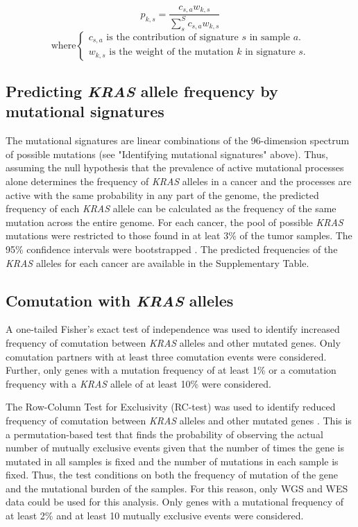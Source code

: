 \documentclass[english, 10pt, letterpaper]{article}
\newcommand{\KRAS}{\emph{KRAS}}
\begin{document}
\begin{equation}
\label{eq:kras_mutation_from_signature}
p_{k,s} = \frac{c_{s,a} w_{k,s}}{\sum_{s}^{S} c_{s,a} w_{k,s}}
\end{equation}
\begin{equation*}
    \text{where} 
    \begin{cases}
        c_{s,a} \text{ is the contribution of signature $s$ in sample $a$.} \\
        w_{k,s} \text{ is the weight of the mutation $k$ in signature $s$.}
    \end{cases}
\end{equation*}


\subsection*{Predicting \KRAS{} allele frequency by mutational signatures}

The mutational signatures are linear combinations of the 96-dimension spectrum of possible mutations (see "Identifying mutational signatures" above).
Thus, assuming the null hypothesis that the prevalence of active mutational processes alone determines the frequency of \KRAS{} alleles in a cancer and the processes are active with the same probability in any part of the genome, the predicted frequency of each \KRAS{} allele can be calculated as the frequency of the same mutation across the entire genome.
For each cancer, the pool of possible \KRAS{} mutations were restricted to those found in at leat 3\% of the tumor samples.
The 95\% confidence intervals were bootstrapped \cite{R-boot}.
The predicted frequencies of the \KRAS{} alleles for each cancer are available in the Supplementary Table.


\subsection*{Comutation with \KRAS{} alleles}

A one-tailed Fisher’s exact test of independence was used to identify increased frequency of comutation between \KRAS{} alleles and other mutated genes.
Only comutation partners with at least three comutation events were considered. 
Further, only genes with a mutation frequency of at least 1\% or a comutation frequency with a \KRAS{} allele of at least 10\% were considered. 

The Row-Column Test for Exclusivity (RC-test) was used to identify reduced frequency of comutation between \KRAS{} alleles and other mutated genes \cite{Leiserson2016}. 
This is a permutation-based test that finds the probability of observing the actual number of mutually exclusive events given that the number of times the gene is mutated in all samples is fixed and the number of mutations in each sample is fixed.
Thus, the test conditions on both the frequency of mutation of the gene and the mutational burden of the samples.
For this reason, only WGS and WES data could be used for this analysis.
Only genes with a mutational frequency of at least 2\% and at least 10 mutually exclusive events were considered.
\end{document}
